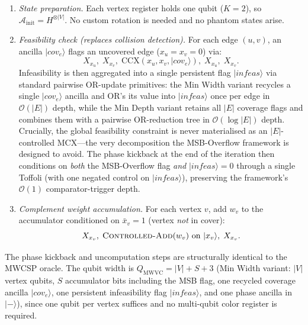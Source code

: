\documentclass{ieeeaccess}
\begin{document}
\begin{enumerate}
  \item \emph{State preparation.} Each vertex register holds one
  qubit ($K=2$), so $\mathcal{A}_\mathrm{init} = H^{\otimes |V|}$.
  No custom rotation is needed and no phantom states arise.

  \item \emph{Feasibility check (replaces collision detection).}
  For each edge $(u,v)$, an ancilla $|\mathit{cov}_e\rangle$ flags
  an uncovered edge ($x_u = x_v = 0$) via:
  \begin{equation}
    X_{x_u},\; X_{x_v},\;
    \mathrm{CCX}(x_u, x_v, |\mathit{cov}_e\rangle),\;
    X_{x_u},\; X_{x_v}.
    \label{eq:mwvc_check}
  \end{equation}
  Infeasibility is then aggregated into a single persistent
  flag $|\mathit{infeas}\rangle$ via standard pairwise OR-update
  primitives: the Min Width variant recycles a single
  $|\mathit{cov}_e\rangle$ ancilla and OR's its value into
  $|\mathit{infeas}\rangle$ once per edge in $\mathcal{O}(|E|)$
  depth, while the Min Depth variant retains all $|E|$ coverage
  flags and combines them with a pairwise OR-reduction tree in
  $\mathcal{O}(\log |E|)$ depth. Crucially, the global feasibility
  constraint is never materialised as an $|E|$-controlled MCX---the
  very decomposition the MSB-Overflow framework is designed to
  avoid. The phase kickback at the end of the iteration then
  conditions on \emph{both} the MSB-Overflow flag \emph{and}
  $|\mathit{infeas}\rangle = 0$ through a single Toffoli (with
  one negated control on $|\mathit{infeas}\rangle$), preserving
  the framework's $\mathcal{O}(1)$ comparator-trigger depth.

  \item \emph{Complement weight accumulation.} For each vertex $v$,
  add $w_v$ to the accumulator conditioned on $\bar{x}_v = 1$
  (vertex \emph{not} in cover):
  \begin{equation}
    X_{x_v},\;
    \textsc{Controlled-Add}(w_v)\text{ on }|x_v\rangle,\;
    X_{x_v}.
    \label{eq:mwvc_add}
  \end{equation}
\end{enumerate}

The phase kickback and uncomputation steps are structurally
identical to the MWCSP oracle. The qubit width is
$Q_{\mathrm{MWVC}} = |V| + S + 3$ (Min Width variant: $|V|$
vertex qubits, $S$ accumulator bits including the MSB flag,
one recycled coverage ancilla $|\mathit{cov}_e\rangle$, one
persistent infeasibility flag $|\mathit{infeas}\rangle$, and
one phase ancilla in $|-\rangle$), since one qubit per vertex
suffices and no multi-qubit color register is required.
\end{document}
